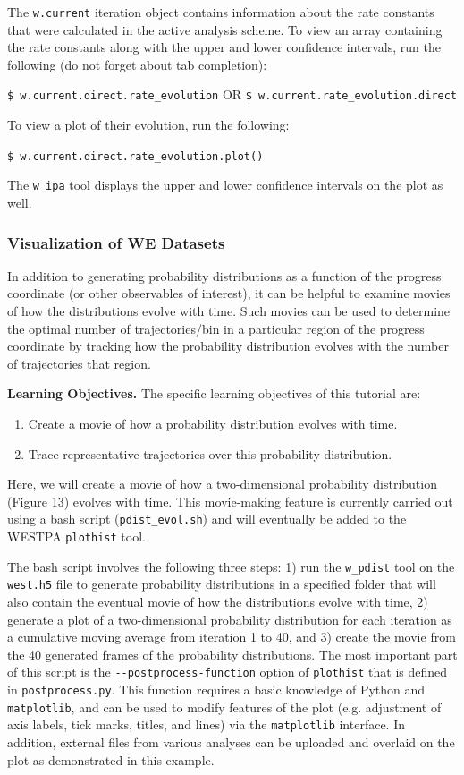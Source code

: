 \documentclass[9pt,tutorial,ASAPversion]{livecoms}
\begin{document}
The \verb|w.current| iteration object contains information about the rate constants that were calculated in the active analysis scheme. 
To view an array containing the rate constants along with the upper and lower confidence intervals, run the following (do not forget about tab completion): 

\verb|$ w.current.direct.rate_evolution| OR \verb|$ w.current.rate_evolution.direct|

To view a plot of their evolution, run the following:

\verb|$ w.current.direct.rate_evolution.plot()|

The \verb|w_ipa| tool displays the upper and lower confidence intervals on the plot as well. 

\subsubsection{Visualization of WE Datasets}

In addition to generating probability distributions as a function of the progress coordinate (or other observables of interest), it can be helpful to examine movies of how the distributions evolve with time. 
Such movies can be used to determine the optimal number of trajectories/bin in a particular region of the progress coordinate by tracking how the probability distribution evolves with the number of trajectories that region. 

\textbf{Learning Objectives.} The specific learning objectives of this tutorial are:
\begin{enumerate}
\item Create a movie of how a probability distribution evolves with time.
\item Trace representative trajectories over this probability distribution.
\end{enumerate}

Here, we will create a movie of how a two-dimensional probability distribution (Figure 13) evolves with time. 
This movie-making feature is currently carried out using a bash script (\verb|pdist_evol.sh|) and will eventually be added to the WESTPA \verb|plothist| tool. 

The bash script involves the following three steps: 1) run the \verb|w_pdist| tool on the \verb|west.h5| file to generate probability distributions in a specified folder that will also contain the eventual movie of how the distributions evolve with time, 2) generate a plot of a two-dimensional probability distribution for each iteration as a cumulative moving average from iteration 1 to 40, and 3) create the movie from the 40 generated frames of the probability distributions. 
The most important part of this script is the \verb|--postprocess-function| option of \verb|plothist| that is defined in \verb|postprocess.py|. 
This function requires a basic knowledge of Python and \verb|matplotlib|, and can be used to modify features of the plot (e.g. adjustment of axis labels, tick marks, titles, and lines) via the \verb|matplotlib| interface. 
In addition, external files from various analyses can be uploaded and overlaid on the plot as demonstrated in this example. 
\end{document}
